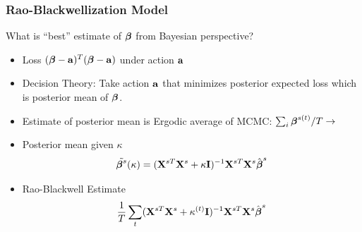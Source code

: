 \documentclass[handout]{beamer}
\begin{document}
\begin{frame}
\frametitle{Rao-Blackwellization Model}

What is ``best'' estimate of $\boldsymbol{\beta}$ from Bayesian perspective?
\begin{itemize}
\item  Loss  $(\boldsymbol{\beta} - \mathbf{a})^T(\boldsymbol{\beta} - \mathbf{a})$   under action $\mathbf{a}$
\item  Decision Theory:  Take action $\mathbf{a}$ that minimizes posterior
  expected loss which is posterior mean of $\boldsymbol{\beta}$.

\item Estimate of posterior mean is Ergodic average of MCMC:
  $\sum_i \boldsymbol{\beta}^{s(t)}/T \to $
\item Posterior mean given $\kappa$
  $$\tilde{\boldsymbol{\beta}^s}(\kappa) = (\mathbf{X}^{sT}\mathbf{X}^s + \kappa \mathbf{I})^{-1}  \mathbf{X}^{sT}\mathbf{X}^s \hat{\boldsymbol{\beta}}^s$$ \pause


\item Rao-Blackwell Estimate
  $$\frac{1}{T}\sum_t (\mathbf{X}^{sT}\mathbf{X}^s + \kappa^{(t)} \mathbf{I})^{-1}  \mathbf{X}^{sT}\mathbf{X}^s \hat{\boldsymbol{\beta}}^s$$ \pause


  \end{itemize}



\end{frame}
\end{document}
